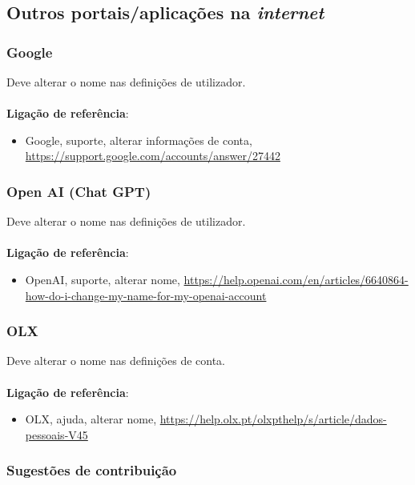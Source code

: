 \subsection{\texorpdfstring{Outros portais/aplicações na \emph{internet}}{Outros portais/aplicações na internet}}

\subsubsection{Google}

Deve alterar o nome nas definições de utilizador. \\
\\
\textbf{Ligação de referência}:
\begin{itemize}
	\item Google, suporte, alterar informações de conta, \url{https://support.google.com/accounts/answer/27442}
\end{itemize}

\subsubsection{Open AI (Chat GPT)}

Deve alterar o nome nas definições de utilizador. \\
\\
\textbf{Ligação de referência}:
\begin{itemize}
	\item OpenAI, suporte, alterar nome, \url{https://help.openai.com/en/articles/6640864-how-do-i-change-my-name-for-my-openai-account}
\end{itemize}

\subsubsection{OLX}

Deve alterar o nome nas definições de conta. \\
\\
\textbf{Ligação de referência}:
\begin{itemize}
	\item OLX, ajuda, alterar nome, \url{https://help.olx.pt/olxpthelp/s/article/dados-pessoais-V45}
\end{itemize}

\subsubsection{Sugestões de contribuição}

